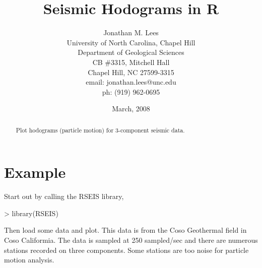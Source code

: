\documentclass{article}
\begin{document}








\author{Jonathan M. Lees\\
University of North Carolina, Chapel Hill\\
Department of Geological Sciences\\
CB \#3315, Mitchell Hall\\
Chapel Hill, NC  27599-3315\\
email: jonathan.lees@unc.edu\\
ph: (919) 962-0695
}
\title{Seismic Hodograms in R}
\date{March, 2008}

\maketitle


\begin{abstract}
Plot hodograms (particle motion) for 3-component seismic data.
\end{abstract}

\section{Example}

Start out by calling the RSEIS library,

\begin{Schunk}
\begin{Sinput}
> library(RSEIS)
\end{Sinput}
\end{Schunk}

Then load some data and plot.  This data is from the Coso Geothermal field in Coso Califormia.
The data is sampled at 250 sampled/sec and there are numerous stations recorded
on three components.   Some stations are too noise for particle motion analysis.
\end{document}

